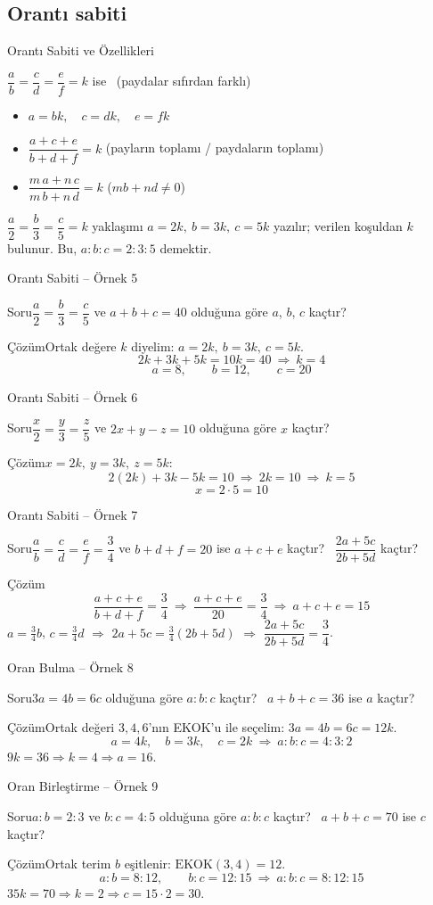 \documentclass[aspectratio=169,11pt,handout]{beamer}
\newcommand{\soru}[3]{%
\begin{frame}{#1}
  \begin{block}{Soru}\large #2\end{block}
  \pause
  \begin{exampleblock}{Çözüm}\large #3\end{exampleblock}
\end{frame}}
\begin{document}
\subsection{Orantı sabiti}
\begin{frame}{Orantı Sabiti ve Özellikleri}
\begin{block}{\(\dfrac{a}{b}=\dfrac{c}{d}=\dfrac{e}{f}=k\) ise \ (paydalar sıfırdan farklı)}
\begin{itemize}
\item \(a=bk,\quad c=dk,\quad e=fk\)
\item \(\dfrac{a+c+e}{b+d+f}=k\) \qquad (payların toplamı / paydaların toplamı)
\item \(\dfrac{m\,a+n\,c}{m\,b+n\,d}=k\) \qquad (\(mb+nd\neq 0\))
\end{itemize}
\end{block}
\begin{block}{\(\dfrac{a}{2}=\dfrac{b}{3}=\dfrac{c}{5}=k\) yaklaşımı}
\(a=2k,\ b=3k,\ c=5k\) yazılır; verilen koşuldan \(k\) bulunur. Bu, \(a:b:c=2:3:5\) demektir.
\end{block}
\end{frame}

\soru{Orantı Sabiti -- Örnek 5}
{\(\dfrac{a}{2}=\dfrac{b}{3}=\dfrac{c}{5}\) ve \(a+b+c=40\) olduğuna göre \(a\), \(b\), \(c\) kaçtır?}
{Ortak değere \(k\) diyelim: \(a=2k,\ b=3k,\ c=5k\).
\[2k+3k+5k=10k=40\ \Rightarrow\ k=4\]
\[a=8,\qquad b=12,\qquad c=20\]}

\soru{Orantı Sabiti -- Örnek 6}
{\(\dfrac{x}{2}=\dfrac{y}{3}=\dfrac{z}{5}\) ve \(2x+y-z=10\) olduğuna göre \(x\) kaçtır?}
{\(x=2k,\ y=3k,\ z=5k\):
\[2(2k)+3k-5k=10\ \Rightarrow\ 2k=10\ \Rightarrow\ k=5\]
\[x=2\cdot 5=10\]}

\soru{Orantı Sabiti -- Örnek 7}
{\(\dfrac{a}{b}=\dfrac{c}{d}=\dfrac{e}{f}=\dfrac{3}{4}\) ve \(b+d+f=20\) ise \(a+c+e\) kaçtır? \ \(\dfrac{2a+5c}{2b+5d}\) kaçtır?}
{\[\frac{a+c+e}{b+d+f}=\frac{3}{4}\ \Rightarrow\ \frac{a+c+e}{20}=\frac{3}{4}\ \Rightarrow\ a+c+e=15\]
\(a=\tfrac34 b\), \(c=\tfrac34 d\) \(\Rightarrow\) \(2a+5c=\tfrac34(2b+5d)\) \(\Rightarrow\) \(\dfrac{2a+5c}{2b+5d}=\dfrac{3}{4}\).}

\soru{Oran Bulma -- Örnek 8}
{\(3a=4b=6c\) olduğuna göre \(a:b:c\) kaçtır? \ \(a+b+c=36\) ise \(a\) kaçtır?}
{Ortak değeri \(3,4,6\)'nın EKOK'u ile seçelim: \(3a=4b=6c=12k\).
\[a=4k,\quad b=3k,\quad c=2k\ \Rightarrow\ a:b:c=4:3:2\]
\(9k=36\Rightarrow k=4\Rightarrow a=16\).}

\soru{Oran Birleştirme -- Örnek 9}
{\(a:b=2:3\) ve \(b:c=4:5\) olduğuna göre \(a:b:c\) kaçtır? \ \(a+b+c=70\) ise \(c\) kaçtır?}
{Ortak terim \(b\) eşitlenir: \(\mathrm{EKOK}(3,4)=12\).
\[a:b=8:12,\qquad b:c=12:15\ \Rightarrow\ a:b:c=8:12:15\]
\(35k=70\Rightarrow k=2\Rightarrow c=15\cdot 2=30\).}
\end{document}
